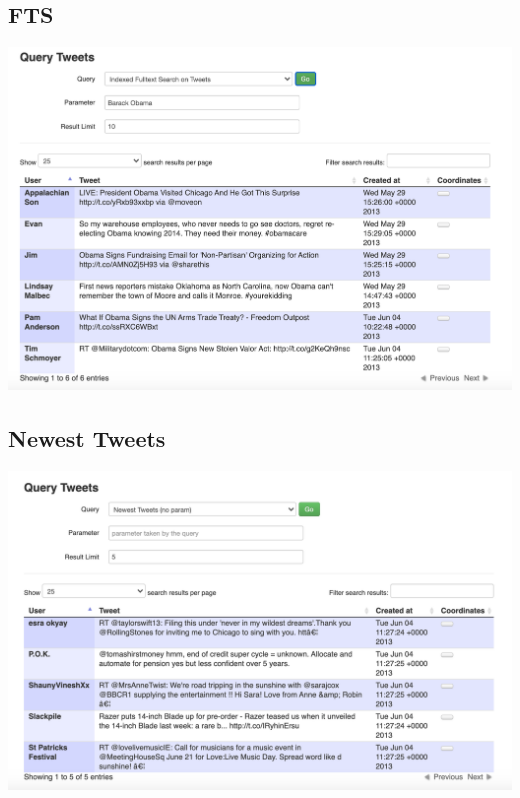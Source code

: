 \documentclass[ngerman]{dis-template-add}
\begin{document}
\subsection*{FTS}
\includegraphics[scale=0.3]{9-fts.png}

\subsection*{Newest Tweets}
\includegraphics[scale=0.3]{10-newest_tweet.png}
\end{document}
